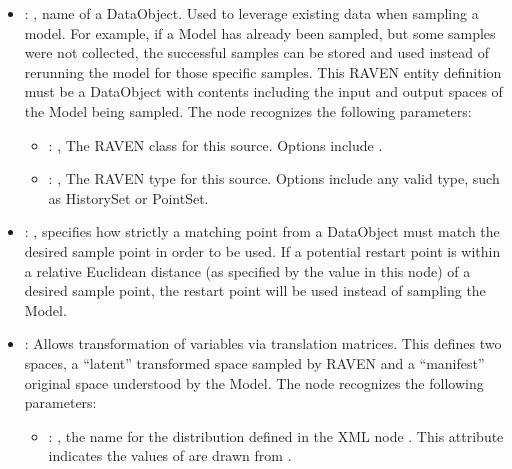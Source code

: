 \begin{itemize}
    \item {}: ,
      name of a DataObject. Used to leverage existing data when sampling a model. For
      example, if a Model has               already been sampled, but some samples were not
      collected, the successful samples can               be stored and used instead of rerunning
      the model for those specific samples. This RAVEN               entity definition must be a
      DataObject with contents including the input and output spaces               of the Model
      being sampled.
      The  node recognizes the following parameters:
        \begin{itemize}
          \item {}: ,
            The RAVEN class for this source. Options include .
          \item {}: ,
            The RAVEN type for this source. Options include any valid  type,
            such as HistorySet or PointSet.
      \end{itemize}

    \item {}: ,
      specifies how strictly a matching point from a  DataObject must match
      the desired sample point in order to be used. If a potential restart point is within a
      relative Euclidean distance (as specified by the value in this node) of a desired sample
      point,               the restart point will be used instead of sampling the Model.

    \item {}:
      Allows transformation of variables via translation matrices. This defines two spaces,
      a ``latent'' transformed space sampled by RAVEN and a ``manifest'' original space understood
      by the Model.
      The  node recognizes the following parameters:
        \begin{itemize}
          \item {}: ,
            the name for the distribution defined in the XML node .
            This attribute indicates the values of  are drawn from
            .
      \end{itemize}


\end{itemize}
